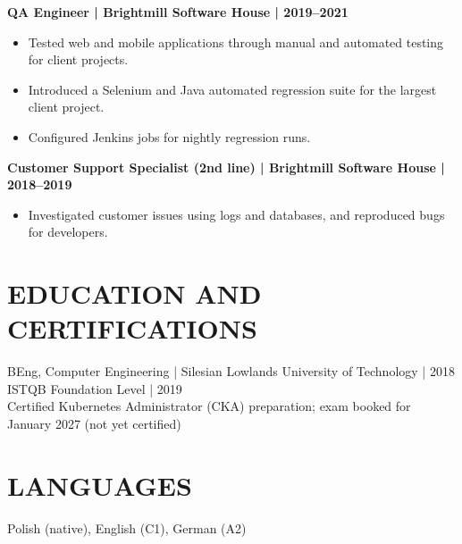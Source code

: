 \documentclass[11pt,a4paper]{article}
\begin{document}
\textbf{QA Engineer | Brightmill Software House | 2019--2021}
\begin{itemize}
\item Tested web and mobile applications through manual and automated testing for client projects.
\item Introduced a Selenium and Java automated regression suite for the largest client project.
\item Configured Jenkins jobs for nightly regression runs.
\end{itemize}

\textbf{Customer Support Specialist (2nd line) | Brightmill Software House | 2018--2019}
\begin{itemize}
\item Investigated customer issues using logs and databases, and reproduced bugs for developers.
\end{itemize}

\section*{EDUCATION AND CERTIFICATIONS}
BEng, Computer Engineering | Silesian Lowlands University of Technology | 2018\\
ISTQB Foundation Level | 2019\\
Certified Kubernetes Administrator (CKA) preparation; exam booked for January 2027 (not yet certified)

\section*{LANGUAGES}
Polish (native), English (C1), German (A2)
\end{document}

